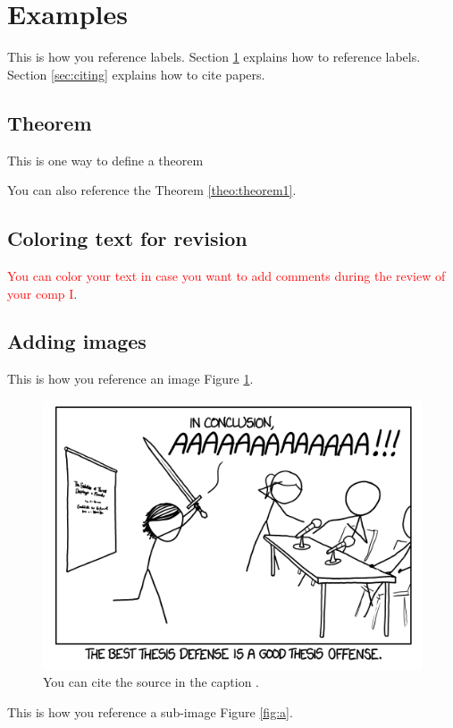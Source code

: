 \section{Examples} \label{sec:section2}

This is how you reference labels. Section \ref{sec:section2} explains how to reference labels. Section \ref{sec:citing} explains how to cite papers.

\subsection{Theorem}
\begin{theorem} \label{theo:theorem1}
This is one way to define a theorem
\end{theorem}

You can also reference the Theorem \ref{theo:theorem1}.

\subsection{Coloring text for revision}
\textcolor{red}{You can color your text in case you want to add comments during the review of your comp I}.

\subsection{Adding images}
This is how you reference an image Figure \ref{fig:example_1}.

\begin{figure}[ht]
    \centering
    \includegraphics[width = 0.3\linewidth]{figures/Thesis_Defence.png}
    \caption{You can cite the source in the caption \cite{xkcd}.}
    \label{fig:example_1}
\end{figure}

This is how you reference a sub-image Figure \ref{fig:a}.

